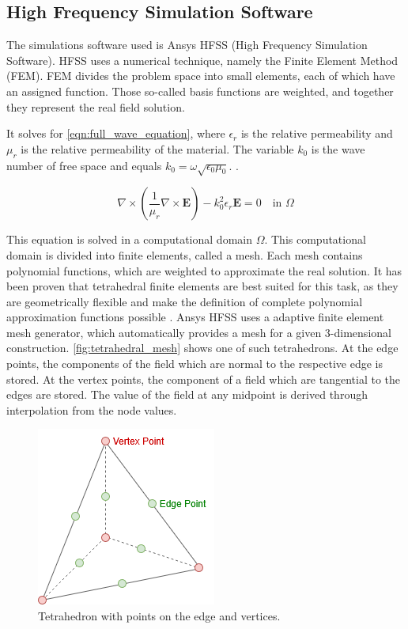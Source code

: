 \subsection{High Frequency Simulation Software}

The simulations software used is Ansys HFSS (High Frequency Simulation Software). HFSS uses a numerical technique, namely the Finite Element Method (FEM). FEM divides the problem space into small elements, each of which have an assigned function. Those so-called basis functions are weighted, and together they represent the real field solution. 


It solves for \autoref{eqn:full_wave_equation}, where $\epsilon_r$ is the relative permeability and $\mu_r$ is the relative permeability of the material. The variable $k_0$ is the wave number of free space and equals $k_0=\omega\sqrt{\epsilon_0\mu_0}$. \cite{Cendes_Lee_1988,Lee_Sun_Cendes_1991,Cendes_1991}.

\begin{equation}
    \nabla\times\left(\frac{1}{\mu_r}\nabla\times\mathbf{E}\right)-k_0^2\epsilon_r\mathbf{E}=0 \quad\text{in $\Omega$}
    \label{eqn:full_wave_equation}
\end{equation}

This equation is solved in a computational domain $\Omega$. This computational domain is divided into finite elements, called a mesh. Each mesh contains polynomial functions, which are weighted to approximate the real solution. It has been proven that tetrahedral finite elements are best suited for this task, as they are geometrically flexible and make the definition of complete polynomial approximation functions possible \cite{Shenton_Cendes_1985}. Ansys HFSS uses a adaptive finite element mesh generator, which automatically provides a mesh for a given 3-dimensional construction. \autoref{fig:tetrahedral_mesh} shows one of such tetrahedrons. At the edge points, the components of the field which are normal to the respective edge is stored. At the vertex points, the component of a field which are tangential to the edges are stored. The value of the field at any midpoint is derived through interpolation from the node values.

\begin{figure}[h]
    \centering
    \includegraphics[width=0.25\linewidth]{Documentation/content/10_theory/img/tetrahedral_mesh.png}
    \caption{Tetrahedron with points on the edge and vertices.}
    \label{fig:tetrahedral_mesh}
\end{figure}

